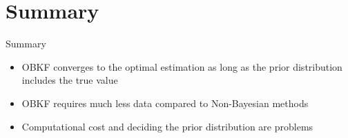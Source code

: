 \section{Summary}
\begin{frame}
    \tableofcontents[currentsection]
\end{frame}

\begin{frame}{Summary}
\begin{itemize}
    \item OBKF converges to the optimal estimation as long as the prior distribution includes the true value
    \item OBKF requires much less data compared to Non-Bayesian methods
    \item Computational cost and deciding the prior distribution are problems
\end{itemize}
\end{frame}